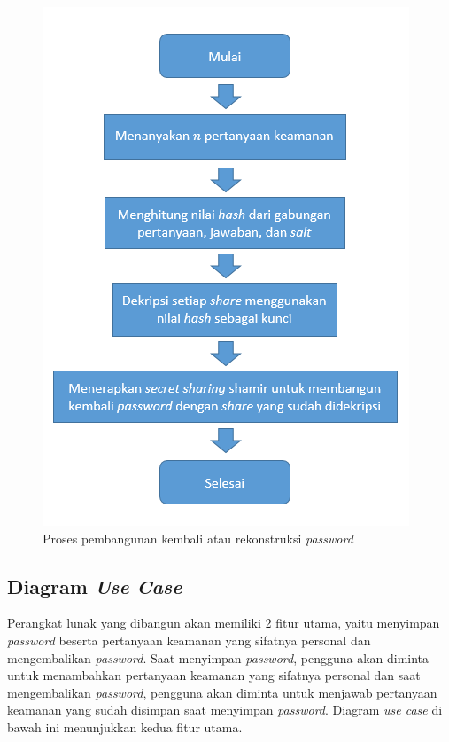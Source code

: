 \begin{figure}[H]
	\centerline{\includegraphics[scale=0.65]{Gambar/flowchart_reconstruct}}
	\label{fig:reconstruct_secret}
	\caption{Proses pembangunan kembali atau rekonstruksi \textit{password}}
\end{figure}

\subsection{Diagram \textit{Use Case}}

Perangkat lunak yang dibangun akan memiliki 2 fitur utama, yaitu menyimpan \textit{password} beserta pertanyaan keamanan yang sifatnya personal dan mengembalikan \textit{password}. Saat menyimpan \textit{password}, pengguna akan diminta untuk menambahkan pertanyaan keamanan yang sifatnya personal dan saat mengembalikan \textit{password}, pengguna akan diminta untuk menjawab pertanyaan keamanan yang sudah disimpan saat menyimpan \textit{password}. Diagram \textit{use case} di bawah ini menunjukkan kedua fitur utama.


